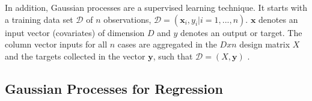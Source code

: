 \documentclass[12pt,a4paper]{report}
\theoremstyle{definition}
\begin{document}
In addition, Gaussian processes are a supervised learning technique. 
It starts with a training data set $\mathcal{D}$ of $n$ observations, $\mathcal{D} = (\textbf{x}_{i}, y_{i} | i = 1, ..., n)$.
$\textbf{x}$ denotes an input vector (covariates) of dimension $D$ and $y$ denotes an output or target. 
The column vector inputs for all $n$ cases are aggregated in the $D x n$ design matrix $X$ and the targets collected in the vector $\textbf{y}$, such that $\mathcal{D} = (X, \textbf{y})$ \citep{RasmussenWilliams2006}.

\subsection{Gaussian Processes for Regression}



%




\end{document}
